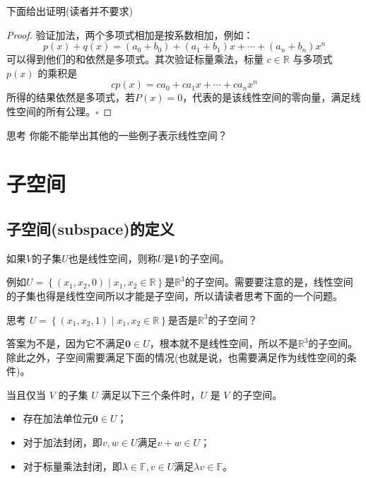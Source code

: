 下面给出证明(读者并不要求)

\begin{proof}
	验证加法，两个多项式相加是按系数相加，例如：$$p(x) + q(x) = (a_0 + b_0) + (a_1 + b_1)x + \cdots + (a_n + b_n)x^n$$可以得到他们的和依然是多项式。其次验证标量乘法，标量 $c \in \mathbb{R}$ 与多项式 $p(x)$ 的乘积是$$c p(x) = c a_0 + c a_1 x + \cdots + c a_n x^n$$所得的结果依然是多项式，若$P(x)=0$，代表的是该线性空间的零向量，满足线性空间的所有公理。$\square$
\end{proof}

\begin{ascolorbox1}{思考}
	你能不能举出其他的一些例子表示线性空间？
\end{ascolorbox1}

\section{子空间}

\subsection{子空间(subspace)的定义}

\begin{definition}
	如果$V$的子集$U$也是线性空间，则称$U$是$V$的子空间。
\end{definition}

例如$U=\left\{ (x_1,x_2,0) \mid x_1,x_2 \in \mathbb{R} \right\}$是$\mathbb{R}^3$的子空间。需要要注意的是，线性空间的子集也得是线性空间所以才能是子空间，所以请读者思考下面的一个问题。

\begin{ascolorbox1}{思考}
	$U=\left\{ (x_1,x_2,1) \mid x_1,x_2 \in \mathbb{R} \right\}$是否是$\mathbb{R}^3$的子空间？
\end{ascolorbox1}

答案为不是，因为它不满足$\boldsymbol{0}\in U$，根本就不是线性空间，所以不是$\mathbb{R}^3$的子空间。除此之外，子空间需要满足下面的情况(也就是说，也需要满足作为线性空间的条件)。

\begin{corollary}
	当且仅当 $V$ 的子集 $U$ 满足以下三个条件时，$U$ 是 $V$ 的子空间。
	\begin{itemize}
		\item 存在加法单位元$\boldsymbol{0}\in U$；
		\item 对于加法封闭，即$v,w\in U$满足$v+w\in U$；
		\item 对于标量乘法封闭，即$\lambda \in \mathbb{F},v\in U$满足$\lambda v\in \mathbb{F}$。
	\end{itemize}
\end{corollary}

